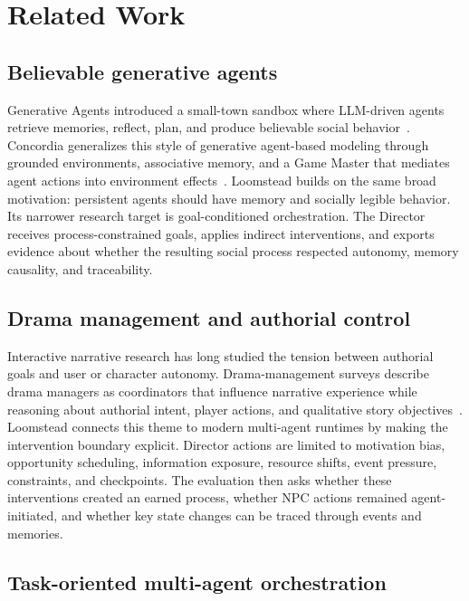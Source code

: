 \section{Related Work}

\subsection{Believable generative agents}

Generative Agents introduced a small-town sandbox where LLM-driven agents retrieve memories, reflect, plan, and produce believable social behavior~\cite{park2023generativeAgents}. Concordia generalizes this style of generative agent-based modeling through grounded environments, associative memory, and a Game Master that mediates agent actions into environment effects~\cite{vezhnevets2023concordia}. Loomstead builds on the same broad motivation: persistent agents should have memory and socially legible behavior. Its narrower research target is goal-conditioned orchestration. The Director receives process-constrained goals, applies indirect interventions, and exports evidence about whether the resulting social process respected autonomy, memory causality, and traceability.

\subsection{Drama management and authorial control}

Interactive narrative research has long studied the tension between authorial goals and user or character autonomy. Drama-management surveys describe drama managers as coordinators that influence narrative experience while reasoning about authorial intent, player actions, and qualitative story objectives~\cite{roberts2008dramaManagementSurvey}. Loomstead connects this theme to modern multi-agent runtimes by making the intervention boundary explicit. Director actions are limited to motivation bias, opportunity scheduling, information exposure, resource shifts, event pressure, constraints, and checkpoints. The evaluation then asks whether these interventions created an earned process, whether NPC actions remained agent-initiated, and whether key state changes can be traced through events and memories.

\subsection{Task-oriented multi-agent orchestration}


